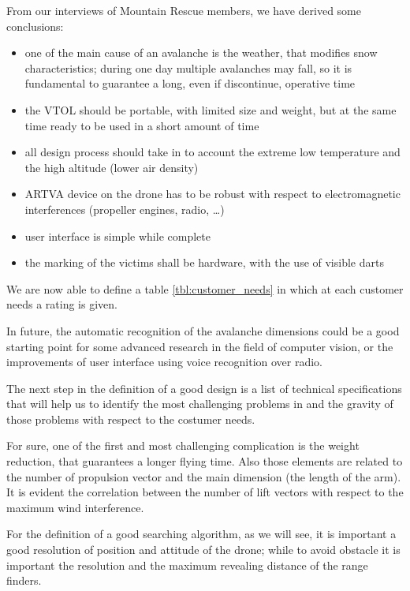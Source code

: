 From our interviews of Mountain Rescue members, we have derived some conclusions:
\begin{itemize}
\item one of the main cause of an avalanche is the weather, that modifies snow characteristics; during one day multiple avalanches may fall, so it is fundamental to guarantee a long, even if discontinue, operative time
\item the VTOL should be portable, with limited size and weight, but at the same time ready to be used in a short amount of time
\item all design process should take in to account the extreme low temperature and the high altitude (lower air density)
\item ARTVA device on the drone has to be robust with respect to electromagnetic interferences (propeller engines, radio, \dots)
\item user interface is simple while complete
\item the marking of the victims shall be hardware, with the use of visible darts
\end{itemize}


We are now able to define a table \ref{tbl:customer_needs} in which at each customer needs a rating is given.

In future, the automatic recognition of the avalanche dimensions could be a good starting point for some advanced research in the field of computer vision, or the improvements of user interface using voice recognition over radio.

The next step in the definition of a good design is a list of technical specifications that will help us to identify the most challenging problems in and the gravity of those problems with respect to the costumer needs.

For sure, one of the first and most challenging complication is the weight reduction, that guarantees a longer flying time. Also those elements are related to the number of  propulsion vector and the main dimension (the length of the arm). It is evident the correlation between the number of lift vectors with respect to the maximum wind interference.

For the definition of a good searching algorithm, as we will see, it is important a good resolution of position and attitude of the drone; while to avoid obstacle it is important the resolution and the maximum revealing distance of the range finders.


